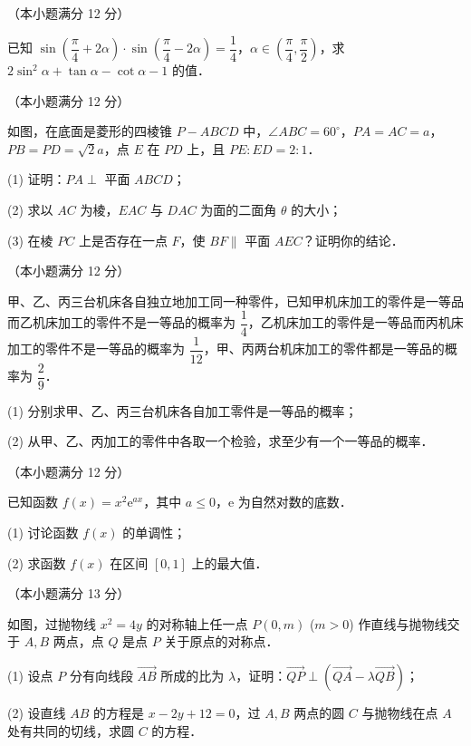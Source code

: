 \begin{question}
（本小题满分 12 分）

已知 $\sin\left(\dfrac{\pi}{4} + 2\alpha\right) \cdot \sin\left(\dfrac{\pi}{4} - 2\alpha\right) = \dfrac{1}{4}$，$\alpha \in \left(\dfrac{\pi}{4}, \dfrac{\pi}{2}\right)$，求 $2\sin^2\alpha + \tan\alpha - \cot\alpha - 1$ 的值．

\Needspace{0.4\textheight}
\end{question}
\begin{question}
（本小题满分 12 分）

如图，在底面是菱形的四棱锥 $P - ABCD$ 中，$\angle ABC = 60^\circ$，$PA = AC = a$，$PB = PD = \sqrt{2}a$，点 $E$ 在 $PD$ 上，且 $PE : ED = 2 : 1$．
\nopagebreak[4]
\begin{center}\end{center}
\nopagebreak[4]
(1) 证明：$PA \perp$ 平面 $ABCD$；

(2) 求以 $AC$ 为棱，$EAC$ 与 $DAC$ 为面的二面角 $\theta$ 的大小；

(3) 在棱 $PC$ 上是否存在一点 $F$，使 $BF \parallel$ 平面 $AEC$？证明你的结论．

\end{question}
\begin{question}
（本小题满分 12 分）

甲、乙、丙三台机床各自独立地加工同一种零件，已知甲机床加工的零件是一等品而乙机床加工的零件不是一等品的概率为 $\dfrac{1}{4}$，乙机床加工的零件是一等品而丙机床加工的零件不是一等品的概率为 $\dfrac{1}{12}$，甲、丙两台机床加工的零件都是一等品的概率为 $\dfrac{2}{9}$．

(1) 分别求甲、乙、丙三台机床各自加工零件是一等品的概率；

(2) 从甲、乙、丙加工的零件中各取一个检验，求至少有一个一等品的概率．

\end{question}
\begin{question}
（本小题满分 12 分）

已知函数 $f(x) = x^2 \mathrm{e}^{ax}$，其中 $a \leqslant 0$，$\mathrm{e}$ 为自然对数的底数．

(1) 讨论函数 $f(x)$ 的单调性；

(2) 求函数 $f(x)$ 在区间 $[0, 1]$ 上的最大值．

\Needspace{0.4\textheight}
\end{question}
\begin{question}
（本小题满分 13 分）

如图，过抛物线 $x^2 = 4y$ 的对称轴上任一点 $P(0, m)$ ($m > 0$) 作直线与抛物线交于 $A, B$ 两点，点 $Q$ 是点 $P$ 关于原点的对称点．
\nopagebreak[4]
\begin{center}\end{center}
\nopagebreak[4]
(1) 设点 $P$ 分有向线段 $\vec{AB}$ 所成的比为 $\lambda$，证明：$\vec{QP} \perp (\vec{QA} - \lambda\vec{QB})$；

(2) 设直线 $AB$ 的方程是 $x - 2y + 12 = 0$，过 $A, B$ 两点的圆 $C$ 与抛物线在点 $A$ 处有共同的切线，求圆 $C$ 的方程．

\Needspace{0.4\textheight}
\end{question}
